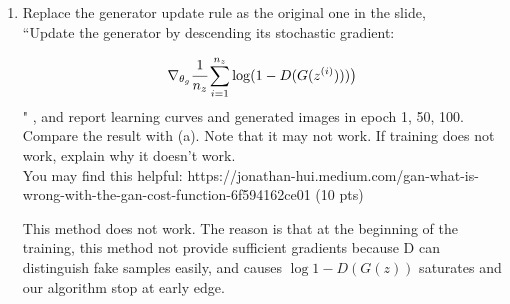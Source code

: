 \documentclass[a4paper]{article}
\theoremstyle{definition}
\newenvironment{soln}{
	\leavevmode\color{blue}\ignorespaces
}{}
\begin{document}
\begin{enumerate} [label=(\alph*)]
				\pagebreak
	\item Replace the generator update rule as the original one in the slide,\\
	      ``Update the generator by descending its stochastic gradient:

	      $$\nabla_{\theta_{g}}  \cfrac{1}{n_{z}}  \sum_{i=1}^{n_{z}}\log (1-D(G(z^{(i)})))\big )$$
	      "
	      , and report learning curves and generated images in epoch 1, 50, 100. Compare the result with (a). Note that it may not work. If training does not work, explain why it doesn't work. \\
	      You may find this helpful: https://jonathan-hui.medium.com/gan-what-is-wrong-with-the-gan-cost-function-6f594162ce01
	      \hfill (10 pts)

	      \begin{soln}
		      This method does not work. The reason is that at the beginning of the training, this method not provide sufficient gradients because D can distinguish fake samples easily, and causes $\log{ 1 - D(G(z)) }$ saturates and our algorithm stop at early edge. \cite{goodfellow2014generative}


\end{soln}
\end{enumerate}
\end{document}
